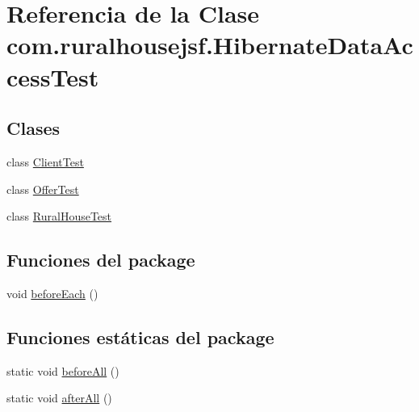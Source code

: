 \hypertarget{classcom_1_1ruralhousejsf_1_1_hibernate_data_access_test}{}\section{Referencia de la Clase com.\+ruralhousejsf.\+Hibernate\+Data\+Access\+Test}
\label{classcom_1_1ruralhousejsf_1_1_hibernate_data_access_test}
\subsection*{Clases}
\begin{DoxyCompactItemize}
\item 
class \mbox{\hyperlink{classcom_1_1ruralhousejsf_1_1_hibernate_data_access_test_1_1_client_test}{Client\+Test}}
\item 
class \mbox{\hyperlink{classcom_1_1ruralhousejsf_1_1_hibernate_data_access_test_1_1_offer_test}{Offer\+Test}}
\item 
class \mbox{\hyperlink{classcom_1_1ruralhousejsf_1_1_hibernate_data_access_test_1_1_rural_house_test}{Rural\+House\+Test}}
\end{DoxyCompactItemize}
\subsection*{Funciones del \textquotesingle{}package\textquotesingle{}}
\begin{DoxyCompactItemize}
\item 
void \mbox{\hyperlink{classcom_1_1ruralhousejsf_1_1_hibernate_data_access_test_a45f50c1176ffaef90f33dccb27e03cdd}{before\+Each}} ()
\end{DoxyCompactItemize}
\subsection*{Funciones estáticas del \textquotesingle{}package\textquotesingle{}}
\begin{DoxyCompactItemize}
\item 
static void \mbox{\hyperlink{classcom_1_1ruralhousejsf_1_1_hibernate_data_access_test_a385a9a721138e301ab9b775298eff369}{before\+All}} ()
\item 
static void \mbox{\hyperlink{classcom_1_1ruralhousejsf_1_1_hibernate_data_access_test_ad178c485d2837875d915e6876d29862c}{after\+All}} ()
\end{DoxyCompactItemize}
